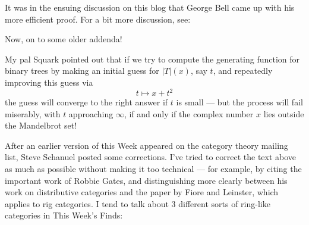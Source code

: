 \documentclass{article}
\def\tightlist{}
\renewcommand{\texttt}[1]{%
  \begingroup
  \ttfamily
  \begingroup\lccode`~=`/\lowercase{\endgroup\def~}{/\discretionary{}{}{}}%
  \begingroup\lccode`~=`[\lowercase{\endgroup\def~}{[\discretionary{}{}{}}%
  \begingroup\lccode`~=`.\lowercase{\endgroup\def~}{.\discretionary{}{}{}}%
  \catcode`/=\active\catcode`[=\active\catcode`.=\active
  \scantokens{#1\noexpand}%
  \endgroup
}
\begin{document}

It was in the ensuing discussion on this blog that George Bell came up
with his more efficient proof. For a bit more discussion, see:


Now, on to some older addenda!

My pal Squark pointed out that if we try to compute the generating
function for binary trees by making an initial guess for \(|T|(x)\), say
\(t\), and repeatedly improving this guess via \[t \mapsto x + t^2\] the
guess will converge to the right answer if \(t\) is small --- but the
process will fail miserably, with \(t\) approaching \(\infty\), if and
only if the complex number \(x\) lies outside the Mandelbrot set!

After an earlier version of this Week appeared on the category theory
mailing list, Steve Schanuel posted some corrections. I've tried to
correct the text above as much as possible without making it too
technical --- for example, by citing the important work of Robbie Gates,
and distinguishing more clearly between his work on distributive
categories and the paper by Fiore and Leinster, which applies to rig
categories. I tend to talk about 3 different sorts of ring-like
categories in This Week's Finds:
\end{document}
